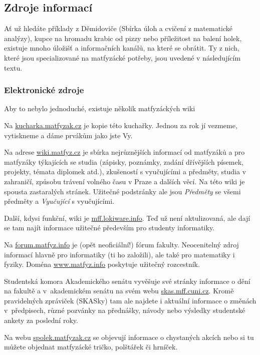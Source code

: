 \subsection{Zdroje informací}
Ať už hledáte příklady z Děmidoviče (Sbírka úloh a cvičení z matematické analýzy), kupce na hromadu krabic od pizzy nebo
příležitost na balení holek, existuje mnoho úložišť a informačních kanálů, na které se obrátit. Ty z nich, které jsou
specializované na matfyzácké potřeby, jsou uvedené v následujícím textu.

\subsubsection{Elektronické zdroje}
Aby to nebylo jednoduché, existuje několik matfyzáckých wiki

Na \url{kucharka.matfyzak.cz} je kopie této kuchařky. Jednou za rok jí vezmeme, vytiskneme a dáme prvákům jako jste Vy.

Na adrese \url{wiki.matfyz.cz} je sbírka nejrůznějších informací od matfyzáků a pro matfyzáky týkajících se studia
(zápisky,
poznámky, zadání dřívějších písemek, projekty, témata diplomek atd.), zkušeností s vyučujícími a předměty, studia v
zahraničí, způsobu trávení volného času v Praze a dalších věcí. Na této wiki je spousta zastaralých stránek. Užitečné
podstránky ale jsou \textit{Předměty} se všemi předměty a \textit{Vyučující} s vyučujícími.

Další, kdysi funkční, wiki je \url{mff.lokiware.info}. Teď už není aktulizovaná, ale dají se tam najít informace
užitečné
především pro studenty informatiky.


Na \url{forum.matfyz.info} je (opět neoficiální!) fórum fakulty. Neocenitelný zdroj informací hlavně pro informatiky (ti
ho založili), ale také pro matematiky i fyziky. Doména \url{www.matfyz.info} poskytuje užitečný rozcestník.

Studentská komora Akademického senátu vyvěšuje své stránky informace o dění na fakultě a v~akademickém senátu na svém
webu \url{skas.mff.cuni.cz}. Kromě pravidelných zpráviček (SKASky) tam ale najdete i aktuální informace o změnách
v~předpisech, různé pozvánky na přednášky, návody nebo výsledky studentské ankety za poslední roky.

Na webu \url{spolek.matfyzak.cz} se objevují informace o chystaných
akcích nebo si tu můžete objednat matfyzácké tričko, polštářek či
hrníček.


